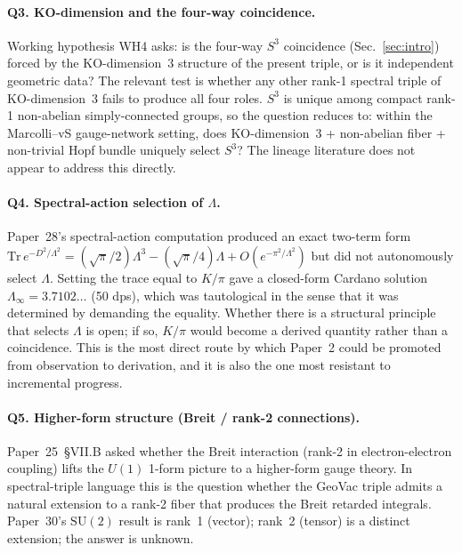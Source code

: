 \documentclass[11pt]{article}
\begin{document}
\paragraph{Q3.  KO-dimension and the four-way coincidence.}  Working
hypothesis WH4 asks: is the four-way $S^3$ coincidence (Sec.~\ref{sec:intro})
forced by the $\mathrm{KO}$-dimension~$3$ structure of the present
triple, or is it independent geometric data?  The relevant test is
whether any other rank-1 spectral triple of $\mathrm{KO}$-dimension~3
fails to produce all four roles.  $S^3$ is unique among compact rank-1
non-abelian simply-connected groups, so the question reduces to:
within the Marcolli--vS gauge-network setting, does
$\mathrm{KO}$-dimension~3 + non-abelian fiber + non-trivial Hopf
bundle uniquely select $S^3$?  The lineage literature does not
appear to address this directly.

\paragraph{Q4.  Spectral-action selection of $\Lambda$.}  Paper~28's
spectral-action computation produced an exact two-term form
$\mathrm{Tr}\,e^{-D^2/\Lambda^2} = (\sqrt{\pi}/2)\Lambda^3 -
(\sqrt{\pi}/4)\Lambda + O(e^{-\pi^2/\Lambda^2})$ but did not
autonomously select $\Lambda$.  Setting the trace equal to $K/\pi$
gave a closed-form Cardano solution $\Lambda_\infty = 3.7102\ldots$
(50 dps), which was tautological in the sense that it was determined
by demanding the equality.  Whether there is a structural principle
that selects $\Lambda$ is open; if so, $K/\pi$ would become a derived
quantity rather than a coincidence.  This is the most direct route by
which Paper~2 could be promoted from observation to derivation, and it
is also the one most resistant to incremental progress.

\paragraph{Q5.  Higher-form structure (Breit / rank-2 connections).}
Paper~25~\S VII.B asked whether the Breit interaction (rank-2 in
electron-electron coupling) lifts the $U(1)$ 1-form picture to a
higher-form gauge theory.  In spectral-triple language this is the
question whether the GeoVac triple admits a natural extension to a
rank-2 fiber that produces the Breit retarded integrals.  Paper~30's
$\mathrm{SU}(2)$ result is rank~1 (vector); rank~2 (tensor) is a
distinct extension; the answer is unknown.
\end{document}
